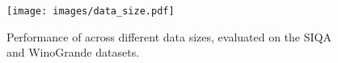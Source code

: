 \begin{figure}[!ht]
    \centering
    \texttt{[image: images/data\_size.pdf]}
    \caption{\label{fig:data_size}
    Performance of \jola{} across different data sizes, evaluated on the SIQA and WinoGrande datasets.
    }
\end{figure}
